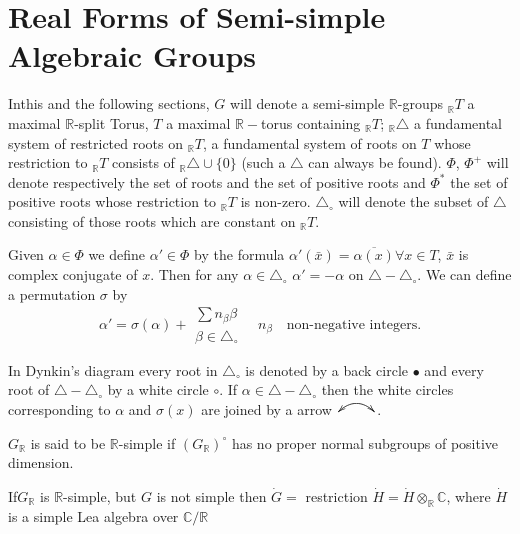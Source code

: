 
\chapter{Real Forms of Semi-simple Algebraic Groups}\label{chap6}

In\pageoriginale this and the following sections, $G$ will denote a semi-simple
$\mathbb{R}$-groups ${}_\mathbb{R}T$ a maximal $\mathbb{R}$-split Torus,
$T$ a maximal $\mathbb{R}-$torus containing ${}_\mathbb{R}T$;
${}_\mathbb{R}\triangle$ a fundamental system of restricted roots on
${}_\mathbb{R}T$, a fundamental system of roots on $T$ whose restriction
to ${}_\mathbb{R}T$ consists of ${}_\mathbb{R} \triangle \cup \{ 0 \}$
(such a $\triangle$ can always be found). $\Phi$, $\Phi^+$ will denote
respectively the set of roots and the set of positive roots and
$\Phi^*$ the set of positive roots whose restriction to ${}_\mathbb{R}
T$ is non-zero. $\triangle_\circ$ will denote the subset of $\triangle$
consisting of those roots which are constant on ${}_\mathbb{R}T$.

Given $\alpha \in \Phi$ we define $\alpha' \in \Phi$ by the formula
 $\alpha'(\bar{x})= \overline{\alpha(x)}  \forall x \in
T$, $\bar{x}$ is complex conjugate of $x$. Then for any $\alpha \in
\triangle_\circ$ $\alpha' =- \alpha$ on $\triangle -
\triangle_\circ$. We can define a permutation $\sigma$ by
$$
\alpha' = \sigma (\alpha) + \substack{\sum n_\beta \beta\\\beta \in
  \triangle_\circ} \quad n_\beta \quad \text{non-negative integers}.
$$


In Dynkin's diagram every root in $\triangle_\circ$ is denoted by a
back circle $\bullet$ and every root of $\triangle- \triangle_\circ$
by a white circle $\circ$. If $\alpha \in \triangle - \triangle_\circ$
then the white circles corresponding to $\alpha$ and $\sigma(x)$ are
joined by a arrow $\xymatrix@1{\ar@{<->}@/^/[r] &}$.

\begin{defi*}
  $G_\mathbb{R}$ is said to be $\mathbb{R}$-simple if
  $(G_\mathbb{R})^\circ$ has no proper normal subgroups of positive
  dimension. 
\end{defi*}

If\pageoriginale $G_{\mathbb{R}}$ is $\mathbb{R}$-simple, but $G$ is not
simple then $\dot {G}=$ restriction $\dot{H} = \dot{H}
\mathop{\otimes}_\mathbb{R} \mathbb{C}$, where $\dot{H}$ is a simple
Lea algebra over $\mathbb{C}/\mathbb{R}$

